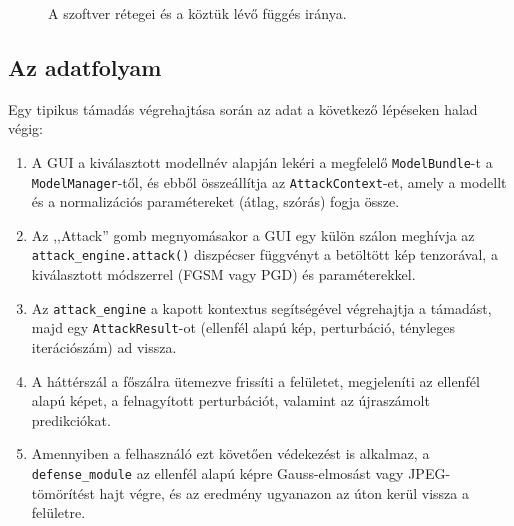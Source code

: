 \begin{figure}[htb]
\centering
{}
\caption{A szoftver rétegei és a köztük lévő függés iránya.}
\label{fig:architecture-layers}
\end{figure}

\subsection{Az adatfolyam}
Egy tipikus támadás végrehajtása során az adat a következő lépéseken halad végig: 
\begin{enumerate}
  \item A GUI a kiválasztott modellnév alapján lekéri a megfelelő \texttt{ModelBundle}-t a \texttt{ModelManager}-től, és ebből 
        összeállítja az \texttt{AttackContext}-et, amely a modellt és a normalizációs paramétereket (átlag, szórás) fogja össze. 
  \item Az ,,Attack'' gomb megnyomásakor a GUI egy külön szálon meghívja az \texttt{attack\_engine.attack()} diszpécser 
        függvényt a betöltött kép tenzorával, a kiválasztott módszerrel (FGSM vagy PGD) és paraméterekkel. 
  \item Az \texttt{attack\_engine} a kapott kontextus segítségével végrehajtja a támadást, majd egy \texttt{AttackResult}-ot 
        (ellenfél alapú kép, perturbáció, tényleges iterációszám) ad vissza. 
  \item A háttérszál a főszálra ütemezve frissíti a felületet, megjeleníti az ellenfél alapú képet, a felnagyított perturbációt, 
        valamint az újraszámolt predikciókat. 
  \item Amennyiben a felhasználó ezt követően védekezést is alkalmaz, a \texttt{defense\_module} az ellenfél alapú képre 
        Gauss-elmosást vagy JPEG-tömörítést hajt végre, és az eredmény ugyanazon az úton kerül vissza a felületre. 
\end{enumerate}

